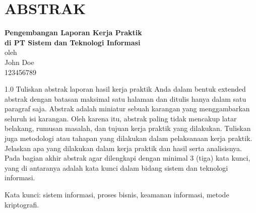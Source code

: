 \chapter*{ABSTRAK}

\begin{center}

    \textbf{Pengembangan Laporan Kerja Praktik \\di PT Sistem dan Teknologi Informasi } \\
    \vspace{0.4cm}
    oleh \\
    \vspace{0.4cm}
    John Doe\\
    123456789\\
\end{center}


\begin{spacing}{1.0}
Tuliskan abstrak laporan hasil kerja praktik Anda dalam bentuk extended abstrak dengan batasan maksimal satu halaman dan ditulis hanya dalam satu paragraf saja. 
Abstrak adalah miniatur sebuah karangan yang menggambarkan seluruh isi karangan. 
Oleh karena itu, abstrak paling tidak mencakup latar belakang, rumusan masalah, dan tujuan kerja praktik 
yang dilakukan. Tuliskan juga metodologi atau tahapan yang dilakukan dalam pelaksanaan kerja praktik. 
Jelaskan apa yang dilakukan dalam kerja praktik dan hasil serta analisisnya. Pada bagian akhir abstrak agar dilengkapi dengan minimal 3 (tiga) kata kunci, 
yang di antaranya adalah kata kunci dalam bidang sistem dan teknologi informasi.

Kata kunci: sistem informasi, proses bisnis, keamanan informasi, metode kriptografi.

\end{spacing}

